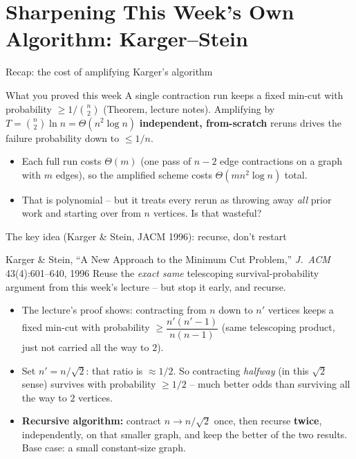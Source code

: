 \documentclass[11pt,aspectratio=169]{beamer}
\begin{document}
\section{Sharpening This Week's Own Algorithm: Karger--Stein}

\begin{frame}{Recap: the cost of amplifying Karger's algorithm}
  \begin{block}{What you proved this week}
    A single contraction run keeps a fixed min-cut with probability
    $\ge 1/\binom{n}{2}$ (Theorem, lecture notes). Amplifying by
    $T = \binom{n}{2}\ln n = \Theta(n^2\log n)$ \textbf{independent, from-scratch}
    reruns drives the failure probability down to $\le 1/n$.
  \end{block}
  \begin{itemize}
    \item Each full run costs $\Theta(m)$ (one pass of $n-2$ edge contractions on a
    graph with $m$ edges), so the amplified scheme costs
    $\Theta(mn^2\log n)$ total.
    \item That is polynomial -- but it treats every rerun as throwing away \emph{all}
    prior work and starting over from $n$ vertices. Is that wasteful?
  \end{itemize}
\end{frame}

\begin{frame}{The key idea (Karger \& Stein, JACM 1996): recurse, don't restart}
  \begin{block}{Karger \& Stein, ``A New Approach to the Minimum Cut Problem,''
  \emph{J.\ ACM} 43(4):601--640, 1996}
    Reuse the \emph{exact same} telescoping survival-probability argument from this
    week's lecture -- but stop it early, and recurse.
  \end{block}
  \begin{itemize}
    \item The lecture's proof shows: contracting from $n$ down to $n'$ vertices keeps a
    fixed min-cut with probability $\ge \dfrac{n'(n'-1)}{n(n-1)}$ (same telescoping
    product, just not carried all the way to $2$).
    \item Set $n' = n/\sqrt2$: that ratio is $\approx 1/2$. So contracting \emph{halfway}
    (in this $\sqrt2$ sense) survives with probability $\ge 1/2$ -- much better odds
    than surviving all the way to $2$ vertices.
    \item \textbf{Recursive algorithm:} contract $n \to n/\sqrt2$ once, then recurse
    \textbf{twice}, independently, on that smaller graph, and keep the better of the
    two results. Base case: a small constant-size graph.
  \end{itemize}
\end{frame}
\end{document}
